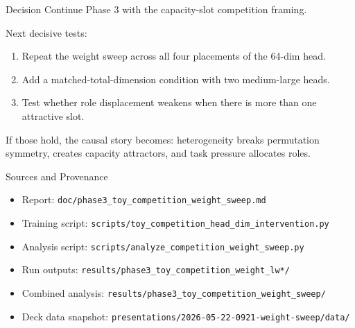 \documentclass[aspectratio=169]{beamer}
\begin{document}
\begin{frame}{Decision}
  Continue Phase 3 with the capacity-slot competition framing.

  \vspace{0.8em}
  Next decisive tests:
  \begin{enumerate}
    \item Repeat the weight sweep across all four placements of the 64-dim head.
    \item Add a matched-total-dimension condition with two medium-large heads.
    \item Test whether role displacement weakens when there is more than one attractive slot.
  \end{enumerate}

  \vspace{0.7em}
  If those hold, the causal story becomes: heterogeneity breaks permutation
  symmetry, creates capacity attractors, and task pressure allocates roles.
\end{frame}

\begin{frame}{Sources and Provenance}
  \scriptsize
  \begin{itemize}
    \item Report: \texttt{doc/phase3\_toy\_competition\_weight\_sweep.md}
    \item Training script: \texttt{scripts/toy\_competition\_head\_dim\_intervention.py}
    \item Analysis script: \texttt{scripts/analyze\_competition\_weight\_sweep.py}
    \item Run outputs: \texttt{results/phase3\_toy\_competition\_weight\_lw*/}
    \item Combined analysis: \texttt{results/phase3\_toy\_competition\_weight\_sweep/}
    \item Deck data snapshot: \texttt{presentations/2026-05-22-0921-weight-sweep/data/}
  \end{itemize}
\end{frame}
\end{document}
